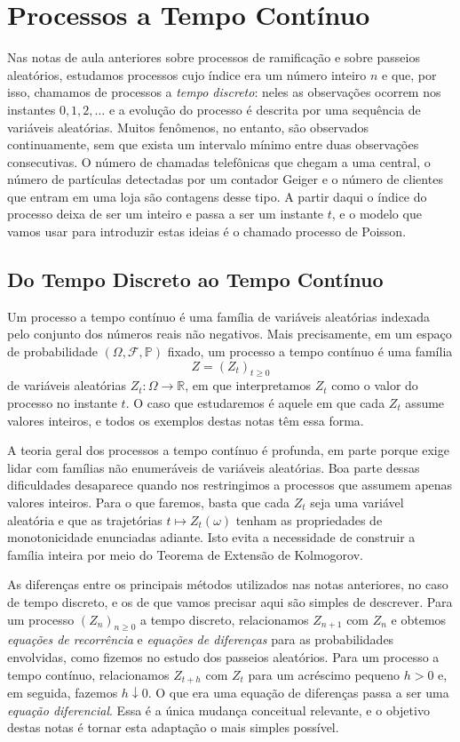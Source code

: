 \documentclass[12pt,portuguese]{article}
\theoremstyle{definition}
\theoremstyle{plainexercise}
\theoremstyle{starredexercise}
\theoremstyle{definition}
\begin{document}
\section{Processos a Tempo Contínuo}\label{sec:tempo-continuo}

Nas notas de aula anteriores sobre processos de ramificação e sobre passeios
aleatórios, estudamos processos cujo índice era um número inteiro $n$ e que,
por isso, chamamos de processos a \emph{tempo discreto}: neles as observações
ocorrem nos instantes $0,1,2,\ldots$ e a evolução do processo é descrita por
uma sequência de variáveis aleatórias. Muitos fenômenos, no entanto, são
observados continuamente, sem que exista um intervalo mínimo entre duas
observações consecutivas. O número de chamadas telefônicas que chegam a uma
central, o número de partículas detectadas por um contador Geiger e o número de
clientes que entram em uma loja são contagens desse tipo. A partir daqui o
índice do processo deixa de ser um inteiro e passa a ser um instante $t$, e o
modelo que vamos usar para introduzir estas ideias é o chamado processo de Poisson.

\subsection{Do Tempo Discreto ao Tempo Contínuo}
\label{subsec:discreto-continuo}

Um processo a tempo contínuo é uma família de variáveis aleatórias indexada pelo
conjunto dos números reais não negativos. Mais precisamente, em um espaço de
probabilidade $(\Omega,\mathcal{F},\mathbb{P})$ fixado, um processo a tempo
contínuo é uma família
\[
  Z=(Z_t)_{t\geqslant0}
\]
de variáveis aleatórias $Z_t:\Omega\to\mathbb{R}$, em que interpretamos $Z_t$
como o valor do processo no instante $t$. O caso que estudaremos é aquele em
que cada $Z_t$ assume valores inteiros, e todos os exemplos destas notas têm
essa forma.

A teoria geral dos processos a tempo contínuo é profunda, em parte porque
exige lidar com famílias não enumeráveis de variáveis aleatórias. Boa parte
dessas dificuldades desaparece quando nos restringimos a processos que assumem
apenas valores inteiros. Para o que faremos, basta que cada $Z_t$ seja uma
variável aleatória e que as trajetórias $t\mapsto Z_t(\omega)$ tenham as
propriedades de monotonicidade enunciadas adiante. Isto evita a necessidade
de construir a família inteira por meio do Teorema de Extensão de Kolmogorov.

As diferenças entre os principais métodos utilizados nas notas anteriores,
no caso de tempo discreto, e os de que vamos precisar aqui são simples de descrever.
Para um processo $(Z_n)_{n\geqslant0}$ a tempo discreto, relacionamos $Z_{n+1}$
com $Z_n$ e obtemos \emph{equações de recorrência} e \emph{equações de
diferenças} para as probabilidades envolvidas, como fizemos no estudo dos
passeios aleatórios. Para um processo a tempo contínuo, relacionamos $Z_{t+h}$
com $Z_t$ para um acréscimo pequeno $h>0$ e, em seguida, fazemos $h\downarrow0$.
O que era uma equação de diferenças passa a ser uma \emph{equação diferencial}.
Essa é a única mudança conceitual relevante, e o objetivo destas notas é tornar
esta adaptação o mais simples possível.
\end{document}

